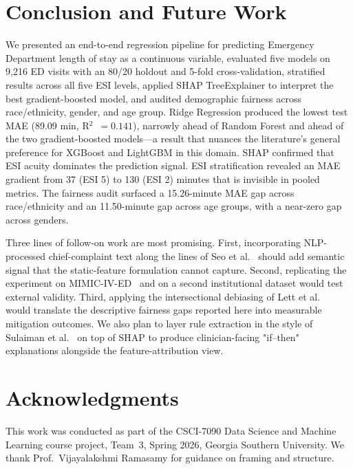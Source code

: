 \documentclass[conference]{IEEEtran}
\begin{document}
\section{Conclusion and Future Work}\label{sec:conclusion}

We presented an end-to-end regression pipeline for predicting Emergency
Department length of stay as a continuous variable, evaluated five models on
9{,}216 ED visits with an 80/20 holdout and 5-fold cross-validation,
stratified results across all five ESI levels, applied SHAP TreeExplainer
to interpret the best gradient-boosted model, and audited demographic
fairness across race/ethnicity, gender, and age group. Ridge Regression
produced the lowest test MAE (89.09 min, R$^2$~$=0.141$), narrowly ahead of
Random Forest and ahead of the two gradient-boosted models---a result that
nuances the literature's general preference for XGBoost and LightGBM in this
domain. SHAP confirmed that ESI acuity dominates the prediction signal. ESI
stratification revealed an MAE gradient from 37 (ESI 5) to 130 (ESI 2)
minutes that is invisible in pooled metrics. The fairness audit surfaced a
15.26-minute MAE gap across race/ethnicity and an 11.50-minute gap across
age groups, with a near-zero gap across genders.

Three lines of follow-on work are most promising. First, incorporating
NLP-processed chief-complaint text along the lines of Seo et
al.~\cite{seo2024} should add semantic signal that the static-feature
formulation cannot capture. Second, replicating the experiment on
MIMIC-IV-ED~\cite{xie2022, mimic} and on a second institutional dataset
would test external validity. Third, applying the intersectional
debiasing of Lett et al.~\cite{lett2025} would translate the descriptive
fairness gaps reported here into measurable mitigation outcomes. We also
plan to layer rule extraction in the style of Sulaiman
et al.~\cite{sulaiman2025} on top of SHAP to produce clinician-facing
"if--then" explanations alongside the feature-attribution view.

\section*{Acknowledgments}
This work was conducted as part of the CSCI-7090 Data Science and Machine
Learning course project, Team~3, Spring 2026, Georgia Southern University.
We thank Prof.~Vijayalakshmi Ramasamy for guidance on framing and
structure.
\end{document}
